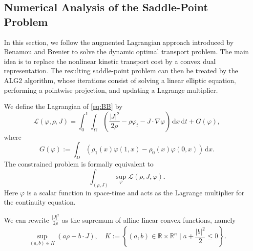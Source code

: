 \subsection{Numerical Analysis of the Saddle-Point Problem}
\label{sec:alg2}

In this section, we follow the augmented Lagrangian approach introduced by Benamou and Brenier \cite{BB2000} to solve the dynamic optimal transport problem. The main idea is to replace the nonlinear kinetic transport cost by a convex dual representation. The resulting saddle-point problem can then be treated by the ALG2 algorithm, whose iterations consist of solving a linear elliptic equation, performing a pointwise projection, and updating a Lagrange multiplier.

We define the Lagrangian of \eqref{eq:BB} by
\begin{equation*}
	\label{eq:alg2_lagrangian}
	\mathcal{L}(\varphi, \rho, J) = \int_0^1\int_\Omega\left(\frac{|J|^2}{2\rho} - \rho\varphi_t -J \cdot \nabla\varphi\right)\,\mathrm dx\,\mathrm dt + G(\varphi),
\end{equation*}
where 
$$
G(\varphi):=\int_\Omega\left(\rho_1(x)\varphi(1,x)-\rho_0(x)\varphi(0,x)\right)\,\mathrm dx.
$$
The constrained problem is formally equivalent to 
$$
\int_{(\rho,J)}\sup_{\varphi}\mathcal L(\rho,J,\varphi).
$$
Here $\varphi$ is a scalar function in space-time and acts as the Lagrange multiplier for the continuity equation.
\begin{lemma}
	We can rewrite $\frac{|J|^2}{2\rho}$ as the supremum of affine linear convex functions, namely
	$$
	\sup_{(a,b)\in K}(a\rho + b \cdot J),\quad K:=\left\{(a,b)\in \mathbb{R}\times \mathbb{R}^n\mid a + \frac{|b|^2}{2}\leq 0\right\}.
	$$
\end{lemma}

